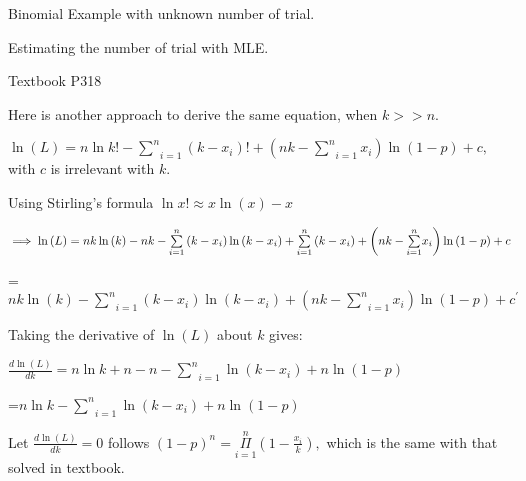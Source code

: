\documentclass{article}
\begin{document}
\bigskip Binomial Example with unknown number of trial.

Estimating the number of trial with MLE.

Textbook P318

Here is another approach to derive the same equation, when $k>>n.$

$\ln \left( L\right) =n\ln k!-\underset{i=1}{\overset{n}{\sum }}\left(
k-x_{i}\right) !+\left( nk-\underset{i=1}{\overset{n}{\sum }}x_{i}\right)
\ln \left( 1-p\right) +c,$with $c$ is irrelevant with $k.$

Using Stirling's formula $\ln x!\approx x\ln \left( x\right) -x$

$\implies \ln \left( L\right) =nk\ln \left( k\right) -nk-\underset{i=1}{%
\overset{n}{\sum }}\left( k-x_{i}\right) \ln \left( k-x_{i}\right) +\underset%
{i=1}{\overset{n}{\sum }}\left( k-x_{i}\right) +\left( nk-\underset{i=1}{%
\overset{n}{\sum }}x_{i}\right) \ln \left( 1-p\right) +c$

=$nk\ln \left( k\right) -\underset{i=1}{\overset{n}{\sum }}\left(
k-x_{i}\right) \ln \left( k-x_{i}\right) +\left( nk-\underset{i=1}{\overset{n%
}{\sum }}x_{i}\right) \ln \left( 1-p\right) +c^{\prime }$

Taking the derivative of $\ln \left( L\right) $ about $k$ gives:

$\frac{d\ln \left( L\right) }{dk}=n\ln k+n-n-\underset{i=1}{\overset{n}{\sum 
}}\ln \left( k-x_{i}\right) +n\ln \left( 1-p\right) $

=$n\ln k-\underset{i=1}{\overset{n}{\sum }}\ln \left( k-x_{i}\right) +n\ln
\left( 1-p\right) $

Let $\frac{d\ln \left( L\right) }{dk}=0$ follows $\left( 1-p\right) ^{n}=%
\underset{i=1}{\overset{n}{\Pi }}\left( 1-\frac{x_{i}}{k}\right) ,$ which is
the same with that solved in textbook.
\end{document}
